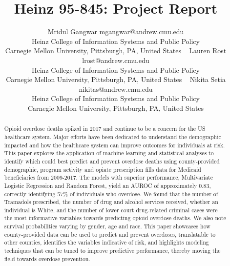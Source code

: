 \documentclass[twoside,10.5pt]{article}
\begin{document}
\title{Heinz 95-845: Project Report}

\author{\name Mridul Gangwar \email mgangwar@andrew.cmu.edu \\
       \addr Heinz College of Information Systems and Public Policy\\
       Carnegie Mellon University, Pittsburgh, PA, United States \
       \AND
       \name Lauren Rost \email lrost@andrew.cmu.edu \\
       \addr Heinz College of Information Systems and Public Policy\\
       Carnegie Mellon University, Pittsburgh, PA, United States \
       \AND
       \name Nikita Setia \email nikitas@andrew.cmu.edu \\
       \addr Heinz College of Information Systems and Public Policy\\
       Carnegie Mellon University, Pittsburgh, PA, United States}
       
\maketitle
\vspace*{5px}
\begin{abstract}
Opioid overdose deaths spiked in 2017 and continue to be a concern for the US healthcare system. Major efforts have been dedicated to understand the demographic impacted and how the healthcare system can improve outcomes for individuals at risk. This paper explores the application of machine learning and statistical analyses to identify which could best predict and prevent overdose deaths using county-provided demographic, program activity and opiate prescription fills data for Medicaid beneficiaries from 2009-2017. The models with superior performance, Multivariate Logistic Regression and Random Forest, yield an AUROC of approximately 0.83, correctly identifying 57\% of individuals who overdose. We found that the number of Tramadols prescribed, the number of drug and alcohol services received, whether an individual is White, and the number of lower court drug-related criminal cases were the most informative variables towards predicting opioid overdose deaths. We also note survival probabilities varying by gender, age and race. This paper showcases how county-provided data can be used to predict and prevent overdoses, translatable to other counties, identifies the variables indicative of risk, and highlights modeling techniques that can be tuned to improve predictive performance, thereby moving the field towards overdose prevention.  
\end{abstract}
\end{document}
